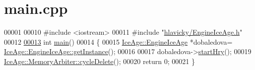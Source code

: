 \hypertarget{main_8cpp_source}{}\section{main.\+cpp}

\begin{DoxyCode}
00001 
00010 \textcolor{preprocessor}{#include <iostream>}
00011 \textcolor{preprocessor}{#include "\hyperlink{EngineIceAge_8h}{hlavicky/EngineIceAge.h}"}
00012 
\hypertarget{main_8cpp_source.tex_l00013}{}\hyperlink{main_8cpp_ae66f6b31b5ad750f1fe042a706a4e3d4}{00013} \textcolor{keywordtype}{int} \hyperlink{main_8cpp_ae66f6b31b5ad750f1fe042a706a4e3d4}{main}()
00014 \{
00015     \hyperlink{classIceAge_1_1EngineIceAge}{IceAge::EngineIceAge} *dobaledova=
      \hyperlink{classIceAge_1_1EngineIceAge_aa542969934711aa691e0df3da701e830}{IceAge::EngineIceAge::getInstance}();
00016 
00017     dobaledova->\hyperlink{classIceAge_1_1EngineIceAge_a69b6bf513ebcd1f83317753a09c159e4}{startHry}(); 
00019     \hyperlink{classIceAge_1_1MemoryArbiter_ae3460492678cf992629f4a70de3ef1ca}{IceAge::MemoryArbiter::cycleDelete}(); 
00020     \textcolor{keywordflow}{return} 0;
00021 \}
\end{DoxyCode}
